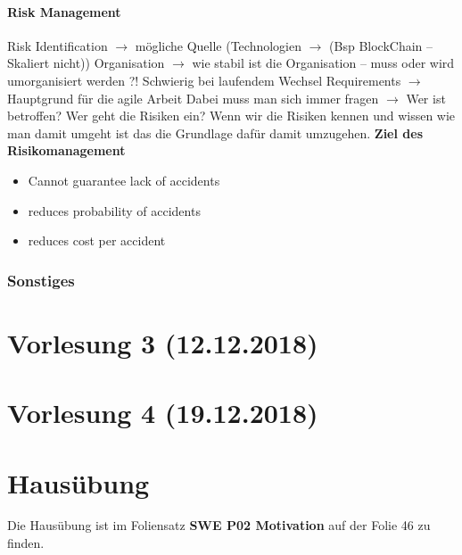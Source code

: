 \documentclass[a4paper,12pt,twoside]{scrreprt}
\begin{document}
\subsubsection{Risk Management}
Risk Identification $\rightarrow$ mögliche Quelle (Technologien $\rightarrow$ (Bsp BlockChain – Skaliert nicht)) \newline
Organisation $\rightarrow$ wie stabil ist die Organisation – muss oder wird umorganisiert werden ?! Schwierig bei laufendem Wechsel\newline
Requirements $\rightarrow$ Hauptgrund für die agile Arbeit \newline
\newline
Dabei muss man sich immer fragen $\rightarrow$ Wer ist betroffen? Wer geht die Risiken ein? Wenn wir die Risiken kennen und wissen wie man damit umgeht ist das die Grundlage dafür damit umzugehen.
\vspace{5mm}
\newline
\textbf{Ziel des Risikomanagement}
\begin{itemize}
  \item{Cannot guarantee lack of accidents}
  \item {reduces probability of accidents}
  \item {reduces cost per accident}
\end{itemize}


\subsection{Sonstiges}

\chapter{Vorlesung 3 (12.12.2018)}

\chapter{Vorlesung 4 (19.12.2018)}

\chapter{Hausübung}
Die Hausübung ist im Foliensatz \textbf{SWE P02 Motivation} auf der Folie 46 zu finden. 
\end{document}

